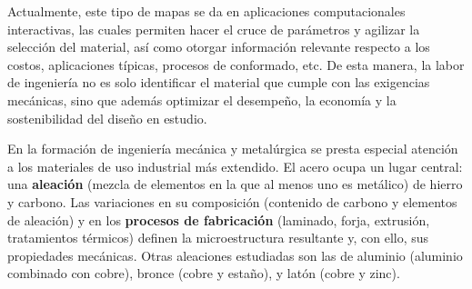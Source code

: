 Actualmente, este tipo de mapas se da en aplicaciones computacionales interactivas, las cuales permiten hacer el cruce de parámetros y agilizar la selección del material, así como otorgar información relevante respecto a los costos, aplicaciones típicas, procesos de conformado, etc. De esta manera, la labor de ingeniería no es solo identificar el material que cumple con las exigencias mecánicas, sino que además optimizar el desempeño, la economía y la sostenibilidad del diseño en estudio.

En la formación de ingeniería mecánica y metalúrgica se presta especial atención a los materiales de uso industrial más extendido. El acero ocupa un lugar central: una \textbf{aleación} (mezcla de elementos en la que al menos uno es metálico) de hierro y carbono. Las variaciones en su composición (contenido de carbono y elementos de aleación) y en los \textbf{procesos de fabricación} (laminado, forja, extrusión, tratamientos térmicos) definen la microestructura resultante y, con ello, sus propiedades mecánicas. Otras aleaciones estudiadas son las de aluminio (aluminio combinado con cobre), bronce (cobre y estaño), y latón (cobre y zinc).

